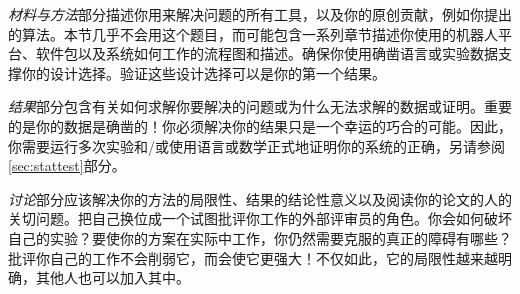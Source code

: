 
\emph{材料与方法}部分描述你用来解决问题的所有工具，以及你的原创贡献，例如你提出的算法。本节几乎不会用这个题目，而可能包含一系列章节描述你使用的机器人平台、软件包以及系统如何工作的流程图和描述。确保你使用确凿语言或实验数据支撑你的设计选择。验证这些设计选择可以是你的第一个结果。


\emph{结果}部分包含有关如何求解你要解决的问题或为什么无法求解的数据或证明。重要的是你的数据是确凿的！你必须解决你的结果只是一个幸运的巧合的可能。因此，你需要运行多次实验和/或使用语言或数学正式地证明你的系统的正确，另请参阅\ref{sec:stattest}部分。


\emph{讨论}部分应该解决你的方法的局限性、结果的结论性意义以及阅读你的论文的人的关切问题。把自己换位成一个试图批评你工作的外部评审员的角色。你会如何破坏自己的实验？要使你的方案在实际中工作，你仍然需要克服的真正的障碍有哪些？批评你自己的工作不会削弱它，而会使它更强大！不仅如此，它的局限性越来越明确，其他人也可以加入其中。

